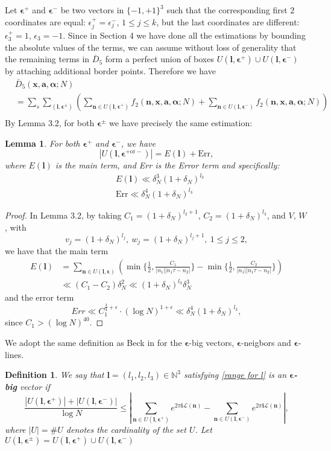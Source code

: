 \documentclass[11pt]{article}
\newtheorem{lem}[thm]{Lemma}
\newtheorem{Def}{Definition}[section]
\newcommand{\beq}{\begin{equation}}
\newcommand{\eeq}{\end{equation}}
\newcommand{\fc}{\frac}
\renewcommand{\l}{\left}
\renewcommand{\r}{\right}
\newcommand{\N}{\mathbb{N}}
\renewcommand{\a}{\alpha}
\newcommand{\e}{\epsilon}
\renewcommand{\i}{\mathbf{i}}
\renewcommand{\(}{\left(}
\renewcommand{\)}{\right)}
\renewcommand{\bf}{\mathbf}
\renewcommand{\d}{\delta}
\newcommand{\bal}{\begin{aligned}}
\newcommand{\eal}{\end{aligned}}
\renewcommand{\L}{\mathcal{L}}
\newcommand{\n}{\bf{n}}
\newcommand{\bma}{\bm{\alpha}}
\newcommand{\ftwo}{f_2(\bf{n},\bf{x},\bm{a},\bm{\a};N)}
\newcommand{\bfe}{\bf{\epsilon}}
\newcommand{\<}{\langle}
\renewcommand{\>}{\rangle}
\begin{document}
Let $\bfe^{+}$ and $\bfe^{-}$ be two vectors in $\{-1,+1\}^{3}$ such that the corresponding first $2$ coordinates are equal: $\e_j^{+}=\e_j^{-}$, $1\le j\le k$, but the last coordinates are different: $\e_{3}^{+}=1$, $\e_{3}=-1$. Since in Section 4 we have done all the estimations by bounding the absolute values of the terms, we can assume without loss of generality that the remaining terms in $\bar{D}_5$ form a perfect union of boxes $U(\bf{l},\bfe^+)\cup U(\bf{l},\bfe^{-})$ by attaching additional border points. Therefore we have 
\beq
\bal
&\bar{D}_5(\bf{x}, \bm{a}, \bma; N)\\
&= \sum_{s}\sum_{(\bf{l}, \bfe^{\pm})}
\l(
\sum_{\n\in U(\bf{l},\bfe^{+})} \ftwo +\sum_{\n\in U(\bf{l},\bfe^{-})} \ftwo
\r)\\
\eal
\eeq
By Lemma 3.2, for both $\bfe^{\pm}$ we have precisely the same estimation:
\begin{lem}\label{Lemma for |U(l,epsilon)|=main + Err}
For both $\bfe^{+}$ and $\bfe^{-}$, we have
\beq\label{estimation for the cardinality of U(l,e)=main term + error term}
|U(\bf{l},\bfe^{+\text{or} -})|=E(\bf{l})+\text{Err},
\eeq
where $E(\bf{l})$ is the main term, and Err is the Error term and specifically:
\beq
\bal
&E(\bf{l})\ll\d_N^{3}(1+\d_N)^{l_{3}}\\
&\text{Err}\ll \d_N^{4}(1+\d_N)^{l_{3}}
\eal
\eeq
\end{lem}
\begin{proof}
In Lemma 3.2, by taking $C_1=(1+\d_N)^{l_3+1}$, $C_2=(1+\d_N)^{l_3}$, and $V$, $W$, with 
$$
v_j=(1+\d_N)^{l_j},\  w_j=(1+\d_N)^{l_j+1}, \  1\le j\le 2,
$$
we have that the main term
$$
\bal
E(\bf{l})&=\sum_{\n\in U(\bf{l}, \bfe)} \l(\min \{\fc{1}{2},\fc{C_1}{|n_1||n_1\tau-n_2|} \}-\min\{\fc{1}{2},\fc{C_2}{|n_1||n_1\tau-n_2|}\}\r)\\
&\ll (C_1-C_2)\d_N^2\ll(1+\d_N)^{l_3}\d_N^3
\eal
$$
and the error term
$$
Err\ll C_1^{\fc{3}{4}+\e}\cdot (\log N)^{1+\e}\ll\d_N^4 (1+\d_N)^{l_3},
$$
since $C_1>(\log N)^{40}$. %
\end{proof}
We adopt the same definition as Beck in \cite{Beck} for the $\bfe$-big vectors, $\bfe$-neigbors and $\bfe$-lines.
\begin{Def}
We say that $\bf{l}=(l_1,l_2,l_3)\in \N^{3}$ satisfying \eqref{range for l} is an \textbf{$\bfe$-big} vector if 
\beq\label{big vector}
\fc{|U(\bf{l},\bfe^+)|+|U(\bf{l},\bfe^-)|}{\log N}\le \l|\sum_{\bf{n}\in U(\bf{l},\bfe^+)}e^{2\pi \i \L(\bf{n})}-\sum_{\bf{n}\in U(\bf{l},\bfe^-)}e^{2\pi \i \L(\bf{n})}\r|,
\eeq
where $|U|=\#U$ denotes the cardinality of the set $U$. Let $U(\bf{l}, \bfe^{\pm})=U(\bf{l}, \bfe^{+})\cup U(\bf{l},\bfe^{-})$
\end{Def}
\end{document}
